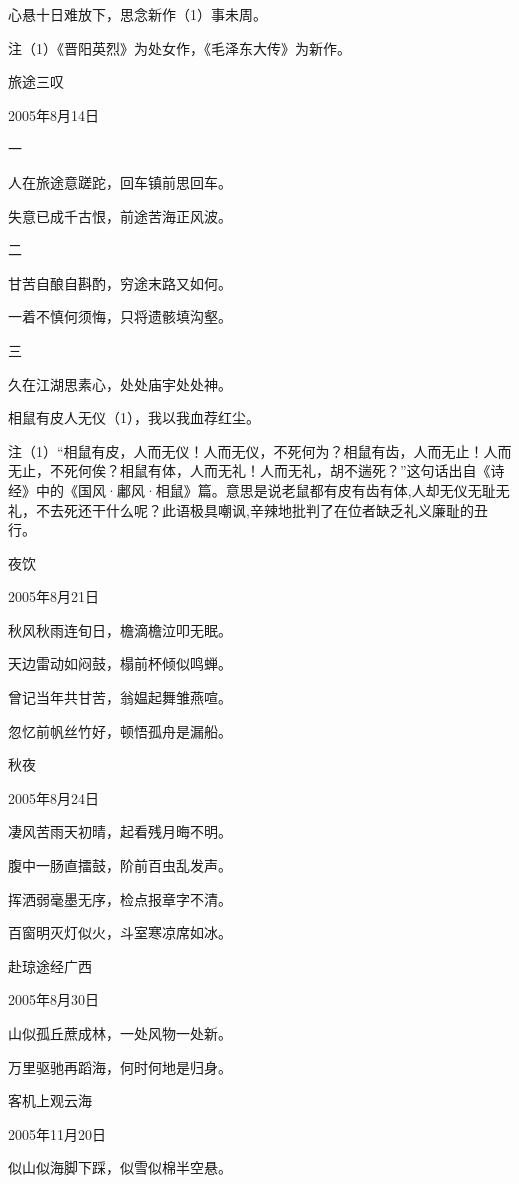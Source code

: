 \documentclass[../../dazhuan.tex]{subfiles}
\begin{document}
心悬十日难放下，思念新作（1）事未周。

注（1）《晋阳英烈》为处女作，《毛泽东大传》为新作。



旅途三叹

2005年8月14日

一

人在旅途意蹉跎，回车镇前思回车。

失意已成千古恨，前途苦海正风波。

二

甘苦自酿自斟酌，穷途末路又如何。

一着不慎何须悔，只将遗骸填沟壑。

三

久在江湖思素心，处处庙宇处处神。

相鼠有皮人无仪（1），我以我血荐红尘。

注（1）“相鼠有皮，人而无仪！人而无仪，不死何为？相鼠有齿，人而无止！人而无止，不死何俟？相鼠有体，人而无礼！人而无礼，胡不遄死？”这句话出自《诗经》中的《国风·鄘风·相鼠》篇。意思是说老鼠都有皮有齿有体,人却无仪无耻无礼，不去死还干什么呢？此语极具嘲讽,辛辣地批判了在位者缺乏礼义廉耻的丑行。



夜饮

2005年8月21日	

秋风秋雨连旬日，檐滴檐泣叩无眠。

天边雷动如闷鼓，榻前杯倾似鸣蝉。

曾记当年共甘苦，翁媪起舞雏燕喧。

忽忆前帆丝竹好，顿悟孤舟是漏船。



秋夜

2005年8月24日

凄风苦雨天初晴，起看残月晦不明。

腹中一肠直擂鼓，阶前百虫乱发声。

挥洒弱毫墨无序，检点报章字不清。

百窗明灭灯似火，斗室寒凉席如冰。



赴琼途经广西

2005年8月30日	

山似孤丘蔗成林，一处风物一处新。

万里驱驰再蹈海，何时何地是归身。



客机上观云海

2005年11月20日

似山似海脚下踩，似雪似棉半空悬。
\end{document}
